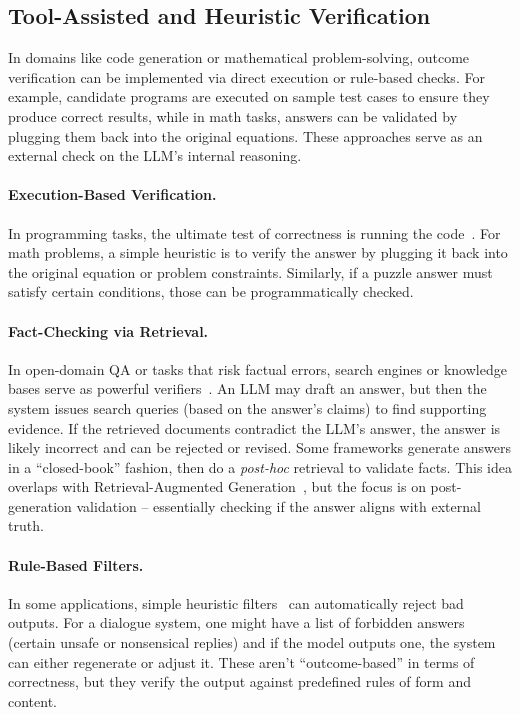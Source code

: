 \subsection{Tool-Assisted and Heuristic Verification}
In domains like code generation or mathematical problem-solving, outcome verification can be implemented via direct execution or rule-based checks. For example, candidate programs are executed on sample test cases to ensure they produce correct results, while in math tasks, answers can be validated by plugging them back into the original equations. These approaches serve as an external check on the LLM's internal reasoning.

\paragraph{Execution-Based Verification.} In programming tasks, the ultimate test of correctness is running the code~\citep{tian2025codehaluinvestigatingcodehallucinations,ni2024nextteachinglargelanguage,yang2024exploringunleashingpowerlarge,ni2023leverlearningverifylanguagetocode}. For math problems, a simple heuristic is to verify the answer by plugging it back into the original equation or problem constraints. Similarly, if a puzzle answer must satisfy certain conditions, those can be programmatically checked.

\paragraph{Fact-Checking via Retrieval.} In open-domain QA or tasks that risk factual errors, search engines or knowledge bases serve as powerful verifiers~\citep{wei2024longformfactualitylargelanguage,vladika2024improvinghealthquestionanswering,asai2023selfraglearningretrievegenerate,peng2023checkfactstryagain}. An LLM may draft an answer, but then the system issues search queries (based on the answer’s claims) to find supporting evidence. If the retrieved documents contradict the LLM’s answer, the answer is likely incorrect and can be rejected or revised. Some frameworks generate answers in a ``closed-book'' fashion, then do a \textit{post-hoc} retrieval to validate facts. This idea overlaps with Retrieval-Augmented Generation~\citep{salemi2024searchenginemachinesunified}, but the focus is on post-generation validation – essentially checking if the answer aligns with external truth. 

\paragraph{Rule-Based Filters.} In some applications, simple heuristic filters~\citep{bai2022constitutionalaiharmlessnessai,NEURIPS2023_0764db11,weber2024redpajamaopendatasettraining} can automatically reject bad outputs. For a dialogue system, one might have a list of forbidden answers (certain unsafe or nonsensical replies) and if the model outputs one, the system can either regenerate or adjust it. These aren’t ``outcome-based'' in terms of correctness, but they verify the output against predefined rules of form and content.
